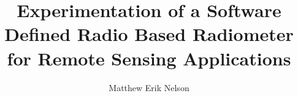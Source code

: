 \title{Experimentation of a Software Defined Radio Based Radiometer for Remote Sensing Applications}
\author{Matthew Erik Nelson}
\notice
\maketitle
